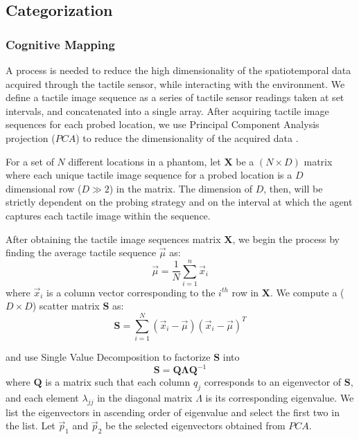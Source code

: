 \documentclass[]{interact}
\theoremstyle{plain}%
\theoremstyle{definition}
\theoremstyle{remark}
\begin{document}
\subsection{Categorization}\label{sec_categorization}
\subsubsection{Cognitive Mapping}\label{sec_dim_reduction}

A process is needed to reduce the high dimensionality of the spatiotemporal data acquired through the 
tactile sensor, while interacting with the environment. We define a tactile image sequence as a series 
of tactile sensor readings taken at set intervals, and concatenated into a single array. After acquiring 
tactile image sequences for each probed location, we use Principal Component Analysis projection ($PCA$) 
\cite{tipping_probabilistic_1999} to reduce the dimensionality of the acquired data \cite{lloyd_least_1982}. 

For a set of $N$ different locations in a phantom, let $\mathbf{X}$ be a $(N\times D)$ matrix where each unique 
tactile image sequence for a probed location is a $D$ dimensional row ($D\gg2$) in the matrix. The dimension 
of $D$, then, will be strictly dependent on the probing strategy and on the interval at which the agent 
captures each tactile image within the sequence. 

After obtaining the tactile image sequences matrix $\mathbf{X}$, we begin the process by finding 
the average tactile sequence $\vec{\mu}$ as:
\begin{equation}
\vec{\mu} = \frac{1}{N}\sum_{i=1}^{n}\vec{x}_i
\end{equation}
where $\vec{x}_i$ is a column vector corresponding to the $i^{th}$ row in $\mathbf{X}$. We compute a 
($D\times D$) scatter matrix $\mathbf{S}$ as:
\begin{equation}
\mathbf{S} = \sum_{i=1}^{N}(\vec{x}_i-\vec{\mu})(\vec{x}_i-\vec{\mu})^T
\end{equation}

and use Single Value Decomposition to factorize $\mathbf{S}$ into
\begin{equation} \label{eq_SVD}
\mathbf{S} = \mathbf{Q}\mathbf{\Lambda} \mathbf{Q}^{-1}
\end{equation}
\noindent where $\mathbf{Q}$ is a matrix such that each column $q_j$ corresponds to an eigenvector 
of $\mathbf{S}$, and each element $\lambda_{jj}$ in the diagonal matrix $\Lambda$ is its corresponding 
eigenvalue. We list the eigenvectors in ascending order of eigenvalue and select the first two in the list. 
Let $\vec{p}_1$ and $\vec{p}_2$ be the selected eigenvectors obtained from $PCA$. 
\end{document}
